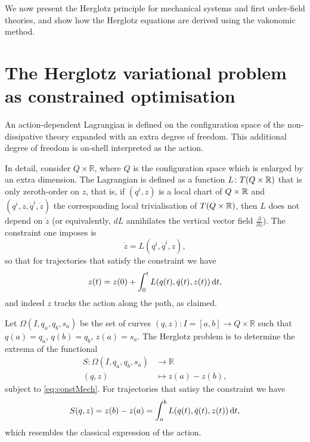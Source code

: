 \documentclass[../main.tex]{subfiles}
\begin{document}
We now present the Herglotz principle for mechanical systems and first order-field theories, and show how the Herglotz equations are derived using the vakonomic method.

\section{The Herglotz variational problem as constrained optimisation}
An action-dependent Lagrangian is defined on the configuration space of the non-dissipative theory expanded with an extra degree of freedom. This additional degree of freedom is on-shell interpreted as the action.

In detail, consider $Q\times\mathbb{R}$, where $Q$ is the configuration space which is enlarged by an extra dimension. The Lagrangian is defined as a function \( L \colon T(Q\times \mathbb{R}) \) that is only zeroth-order on \(z\), that is, if \((q^i, z)\) is a local chart of \(Q\times\mathbb{R}\) and $(q^i,z,\dot{q}^i,\dot z)$ the corresponding local trivialisation of \(T(Q\times \mathbb{R})\), then \(L\) does not depend on \(\dot{z}\) (or equivalently, \(dL\)  annihilates the vertical vector field \(\frac{\partial}{\partial \dot z}\)). The constraint one imposes is
\begin{equation}\label{eq:constMech}
\dot{z}=L(q^i,\dot{q}^i,z),
\end{equation}
so that for trajectories that satisfy the constraint we have
\begin{equation}
z(t) = z(0) + \int_0^t L(q(t), \dot{q}(t), z(t)) \,\mathrm{d} t,
\end{equation}
and indeed \(z\) tracks the action along the path, as claimed.

Let $\Omega(I,q_a,q_b,s_a)$ be the set of curves $(q,z):I=[a,b]\rightarrow Q\times\mathbb{R}$ such that $q(a)=q_a$, $q(b)=q_b$, $z(a)=s_a$. The Herglotz problem is to determine the extrema of the functional
\begin{equation*}
    \begin{aligned}
        S: \Omega(I,q_a,q_b,s_a) &\longrightarrow \mathbb{R}\\
        (q,z) &\longmapsto z(a) - z(b),
    \end{aligned}
\end{equation*}
subject to \cref{eq:constMech}. For trajectories that satisy the constraint we have
\begin{equation}
    S(q,z) = z(b) - z(a) = \int_a^b L(q(t), \dot{q}(t), z(t)) \,\mathrm{d} t,
\end{equation}
which resembles the classical expression of the action.
\end{document}
